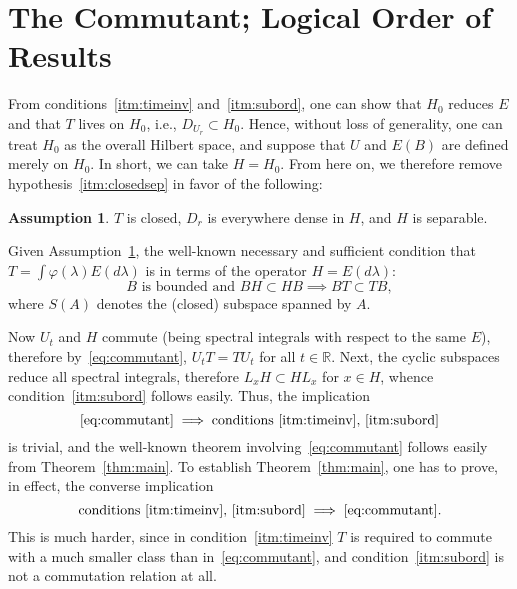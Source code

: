 \documentclass[12pt]{article}
\theoremstyle{definition}
\newtheorem{assumption}[theorem]{Assumption}
\begin{document}
\section{The Commutant; Logical Order of Results}
\label{sec:commutant}

From conditions~\ref{itm:timeinv} and~\ref{itm:subord}, one can show that $H_0$ reduces $E$ and that $T$ lives on $H_0$, i.e., $D_{U_r} \subset H_0$. Hence, without loss of generality, one can treat $H_0$ as the overall Hilbert space, and suppose that $U$ and $E(B)$ are defined merely on $H_0$. In short, we can take $H = H_0$. From here on, we therefore remove hypothesis~\ref{itm:closedsep} in favor of the following:

\begin{assumption}\label{ass:closedense}
$T$ is closed, $D_r$ is everywhere dense in $H$, and $H$ is separable.
\end{assumption}

Given Assumption~\ref{ass:closedense}, the well-known necessary and sufficient condition that $T = \int \varphi(\lambda) E(d\lambda)$ is in terms of the operator $H = E(d\lambda)$:
\begin{equation}
B \text{ is bounded and } BH \subset HB \implies BT \subset TB,
\label{eq:commutant}
\end{equation}
where $S(A)$ denotes the (closed) subspace spanned by $A$.

Now $U_t$ and $H$ commute (being spectral integrals with respect to the same $E$), therefore by~\eqref{eq:commutant}, $U_t T = T U_t$ for all $t\in\mathbb{R}$. Next, the cyclic subspaces reduce all spectral integrals, therefore $L_x H \subset H L_x$ for $x\in H$, whence condition~\ref{itm:subord} follows easily. Thus, the implication
\begin{equation}
\eqref{eq:commutant} \implies \text{conditions~\ref{itm:timeinv},~\ref{itm:subord}}
\label{eq:commutant_implies}
\end{equation}
is trivial, and the well-known theorem involving~\eqref{eq:commutant} follows easily from Theorem~\ref{thm:main}. To establish Theorem~\ref{thm:main}, one has to prove, in effect, the converse implication
\begin{equation}
\text{conditions~\ref{itm:timeinv},~\ref{itm:subord}} \implies \eqref{eq:commutant}.
\label{eq:converse}
\end{equation}
This is much harder, since in condition~\ref{itm:timeinv} $T$ is required to commute with a much smaller class than in~\eqref{eq:commutant}, and condition~\ref{itm:subord} is not a commutation relation at all.
\end{document}
